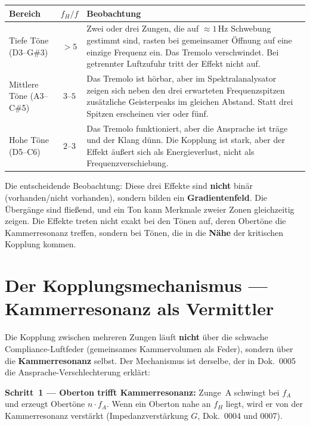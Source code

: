 \documentclass[11pt,a4paper]{article}
\begin{document}
\begin{table}[H]
\centering\small
\begin{tabularx}{\textwidth}{l c X}
\hbtoprule
\textbf{Bereich} & $f_H/f$ & \textbf{Beobachtung} \\
\midrule
Tiefe Töne (D3--G\#3) & $> 5$ & Zwei oder drei Zungen, die auf $\approx 1$\,Hz Schwebung gestimmt sind, rasten bei gemeinsamer Öffnung auf eine einzige Frequenz ein. Das Tremolo verschwindet. Bei getrennter Luftzufuhr tritt der Effekt nicht auf. \\[4pt]
Mittlere Töne (A3--C\#5) & $3$--$5$ & Das Tremolo ist hörbar, aber im Spektralanalysator zeigen sich neben den drei erwarteten Frequenzspitzen zusätzliche Geisterpeaks im gleichen Abstand. Statt drei Spitzen erscheinen vier oder fünf. \\[4pt]
Hohe Töne (D5--C6) & $2$--$3$ & Das Tremolo funktioniert, aber die Ansprache ist träge und der Klang dünn. Die Kopplung ist stark, aber der Effekt äußert sich als Energieverlust, nicht als Frequenzverschiebung. \\
\bottomrule
\end{tabularx}
\end{table}

Die entscheidende Beobachtung: Diese drei Effekte sind \textbf{nicht} binär (vorhanden/nicht vorhanden), sondern bilden ein \textbf{Gradientenfeld}. Die Übergänge sind fließend, und ein Ton kann Merkmale zweier Zonen gleichzeitig zeigen. Die Effekte treten nicht exakt bei den Tönen auf, deren Obertöne die Kammerresonanz treffen, sondern bei Tönen, die in die \textbf{Nähe} der kritischen Kopplung kommen.

\section{Der Kopplungsmechanismus --- Kammerresonanz als Vermittler}

Die Kopplung zwischen mehreren Zungen läuft \textbf{nicht} über die schwache Compliance-Luftfeder (gemeinsames Kammervolumen als Feder), sondern über die \textbf{Kammerresonanz} selbst. Der Mechanismus ist derselbe, der in Dok.~0005 die Ansprache-Verschlechterung erklärt:

\textbf{Schritt~1 --- Oberton trifft Kammerresonanz:} Zunge~A schwingt bei $f_A$ und erzeugt Obertöne $n \cdot f_A$. Wenn ein Oberton nahe an $f_H$ liegt, wird er von der Kammerresonanz verstärkt (Impedanzverstärkung $G$, Dok.~0004 und 0007).
\end{document}
